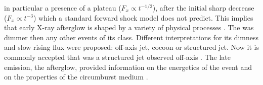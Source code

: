 in particular a presence of a plateau ($F_{x}\propto t^{-1/2}$), after the initial sharp 
decrease ($F_{x}\propto t^{-3}$) which a standard forward shock model does not predict. 
This implies that early X-ray afterglow is shaped by a variety of physical processes 
\citep{Zhang:2005fa}.
%
The \GRB{} was dimmer then any other events of its class. 
Different interpretations for its dimness and slow rising flux were proposed: off-axis jet, 
cocoon or structured jet. Now it is commonly accepted that \GRB{} was a structured jet 
observed off-axis 
\citep[\eg][]{Fong:2017ekk,Troja:2017nqp,Margutti:2018xqd,Lamb:2017ych,Lamb:2018ohw,Ryan:2019fhz,Alexander:2018dcl,Mooley:2018dlz,Ghirlanda:2018uyx}.
The \GRB{} late emission, the afterglow, provided information on 
the energetics of the event and on the properties of the circumburst medium 
\citep[\eg][]{Hajela:2019mjy}. 



